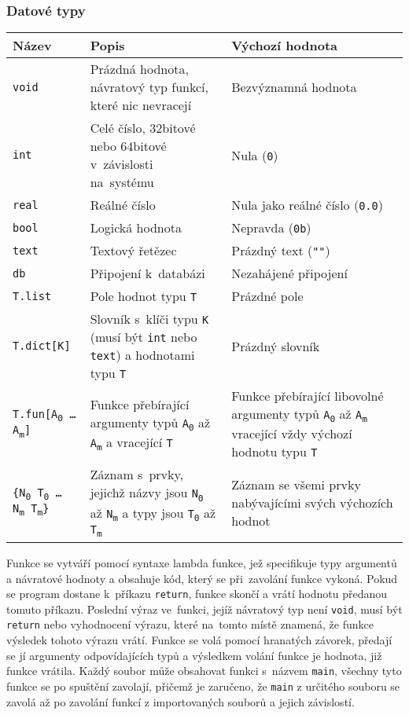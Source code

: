 \documentclass[a4paper,12pt]{article}
\def\quote #1{"#1"}
\begin{document}
\subsubsection{Datové typy}
\begin{tabular}{|m{3.5cm} m{6cm} m{5cm}|}\hline
Název & Popis & Výchozí hodnota \\\hline
\texttt{void} & Prázdná hodnota, návratový typ funkcí, které nic nevracejí & Bezvýznamná hodnota\\\hline
\texttt{int} & Celé číslo, 32bitové nebo 64bitové v~závislosti na~systému & Nula (\texttt{0})\\\hline
\texttt{real} & Reálné číslo & Nula jako reálné číslo (\texttt{0.0})\\\hline
\texttt{bool} & Logická hodnota & Nepravda (\texttt{0b})\\\hline
\texttt{text} & Textový řetězec & Prázdný text (\texttt{\quote{}})\\\hline
\texttt{db} & Připojení k~databázi & Nezahájené připojení\\\hline
\texttt{T.list} & Pole hodnot typu \texttt{T} & Prázdné pole\\\hline
\texttt{T.dict[K]} & Slovník s~klíči typu \texttt{K} (musí být \texttt{int} nebo \texttt{text}) a hodnotami typu \texttt{T} & Prázdný slovník\\\hline
\texttt{T.fun[A\textsubscript{0} \ldots{} A\textsubscript{m}]} & Funkce přebírající argumenty typů \texttt{A\textsubscript{0}} až \texttt{A\textsubscript{m}} a vracející \texttt{T} & Funkce přebírající libovolné argumenty typů \texttt{A\textsubscript{0}} až \texttt{A\textsubscript{m}} vracející vždy výchozí hodnotu typu \texttt{T}\\\hline
\texttt{\{N\textsubscript{0} T\textsubscript{0} \ldots{} N\textsubscript{m} T\textsubscript{m}\}} & Záznam s~prvky, jejichž názvy jsou \texttt{N\textsubscript{0}} až \texttt{N\textsubscript{m}} a typy jsou \texttt{T\textsubscript{0}} až \texttt{T\textsubscript{m}} & Záznam se všemi prvky nabývajícími svých výchozích hodnot\\\hline
\end{tabular}

Funkce se vytváří pomocí syntaxe lambda funkce, jež specifikuje typy argumentů a návratové hodnoty a obsahuje kód, který se při~zavolání funkce vykoná. Pokud se program dostane k~příkazu \texttt{return}, funkce skončí a vrátí hodnotu předanou tomuto příkazu. Poslední výraz ve~funkci, jejíž návratový typ není \texttt{void}, musí být \texttt{return} nebo vyhodnocení výrazu, které na~tomto místě znamená, že funkce výsledek tohoto výrazu vrátí. Funkce se volá pomocí hranatých závorek, předají se jí argumenty odpovídajících typů a výsledkem volání funkce je hodnota, již funkce vrátila. Každý soubor může obsahovat funkci s~názvem \texttt{main}, všechny tyto funkce se po spuštění zavolají, přičemž je zaručeno, že \texttt{main} z určitého souboru se zavolá až po zavolání funkcí z importovaných souborů a jejich závislostí.
\end{document}
